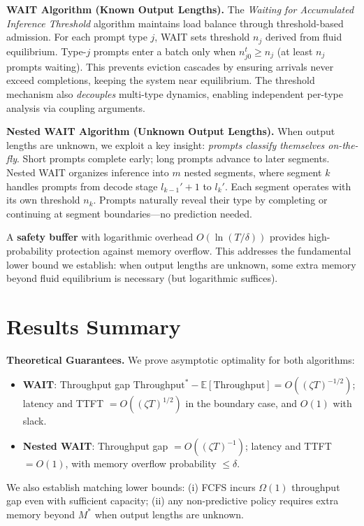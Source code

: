 \documentclass[11pt]{article}
\begin{document}
\textbf{WAIT Algorithm (Known Output Lengths).} The \emph{Waiting for Accumulated Inference Threshold} algorithm maintains load balance through threshold-based admission. For each prompt type $j$, WAIT sets threshold $n_j$ derived from fluid equilibrium. Type-$j$ prompts enter a batch only when $n_{j0}^t \geq n_j$ (at least $n_j$ prompts waiting). This prevents eviction cascades by ensuring arrivals never exceed completions, keeping the system near equilibrium. The threshold mechanism also \emph{decouples} multi-type dynamics, enabling independent per-type analysis via coupling arguments.

\textbf{Nested WAIT Algorithm (Unknown Output Lengths).} When output lengths are unknown, we exploit a key insight: \emph{prompts classify themselves on-the-fly}. Short prompts complete early; long prompts advance to later segments. Nested WAIT organizes inference into $m$ nested segments, where segment $k$ handles prompts from decode stage $l_{k-1}'+1$ to $l_k'$. Each segment operates with its own threshold $n_k$. Prompts naturally reveal their type by completing or continuing at segment boundaries---no prediction needed.

A \textbf{safety buffer} with logarithmic overhead $O(\ln(T/\delta))$ provides high-probability protection against memory overflow. This addresses the fundamental lower bound we establish: when output lengths are unknown, some extra memory beyond fluid equilibrium is necessary (but logarithmic suffices).

\section*{Results Summary}

\textbf{Theoretical Guarantees.} We prove asymptotic optimality for both algorithms:
\begin{itemize}
    \item \textbf{WAIT}: Throughput gap $\text{Throughput}^* - \mathbb{E}[\text{Throughput}] = O((\zeta T)^{-1/2})$; latency and TTFT $= O((\zeta T)^{1/2})$ in the boundary case, and $O(1)$ with slack.
    \item \textbf{Nested WAIT}: Throughput gap $= O((\zeta T)^{-1})$; latency and TTFT $= O(1)$, with memory overflow probability $\leq \delta$.
\end{itemize}
We also establish matching lower bounds: (i) FCFS incurs $\Omega(1)$ throughput gap even with sufficient capacity; (ii) any non-predictive policy requires extra memory beyond $M^*$ when output lengths are unknown.
\end{document}
